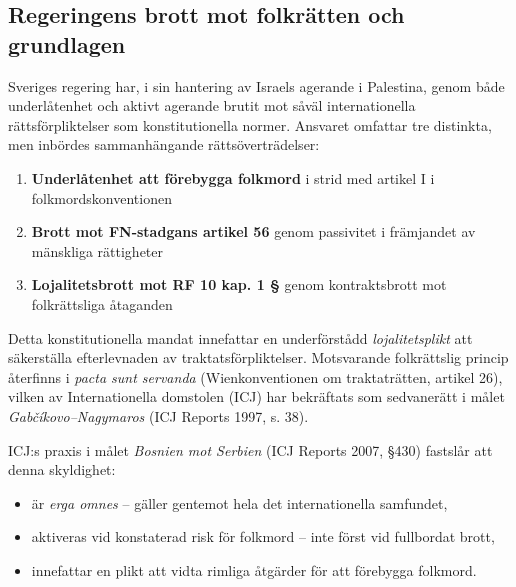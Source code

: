 
\subsection{Regeringens brott mot folkrätten och grundlagen}

Sveriges regering har, i sin hantering av Israels agerande i Palestina, genom både underlåtenhet och aktivt agerande brutit mot såväl internationella rättsförpliktelser som konstitutionella normer. Ansvaret omfattar tre distinkta, men inbördes sammanhängande rättsöverträdelser:

\begin{enumerate}
    \item \textbf{Underlåtenhet att förebygga folkmord} i strid med artikel I i folkmordskonventionen
    \item \textbf{Brott mot FN-stadgans artikel 56} genom passivitet i främjandet av mänskliga rättigheter
    \item \textbf{Lojalitetsbrott mot RF 10 kap. 1 §} genom kontraktsbrott mot folkrättsliga åtaganden
\end{enumerate}


Detta konstitutionella mandat innefattar en underförstådd \textit{lojalitetsplikt} att säkerställa efterlevnaden av traktatsförpliktelser. Motsvarande folkrättslig princip återfinns i \textit{pacta sunt servanda} (Wienkonventionen om traktaträtten, artikel 26), vilken av Internationella domstolen (ICJ) har bekräftats som sedvanerätt i målet \textit{Gabčíkovo–Nagymaros} (ICJ Reports 1997, s. 38).


ICJ:s praxis i målet \textit{Bosnien mot Serbien} (ICJ Reports 2007, §430) fastslår att denna skyldighet:

\begin{itemize}
    \item är \textit{erga omnes} – gäller gentemot hela det internationella samfundet,
    \item aktiveras vid konstaterad risk för folkmord – inte först vid fullbordat brott,
    \item innefattar en plikt att vidta rimliga åtgärder för att förebygga folkmord.
\end{itemize}

